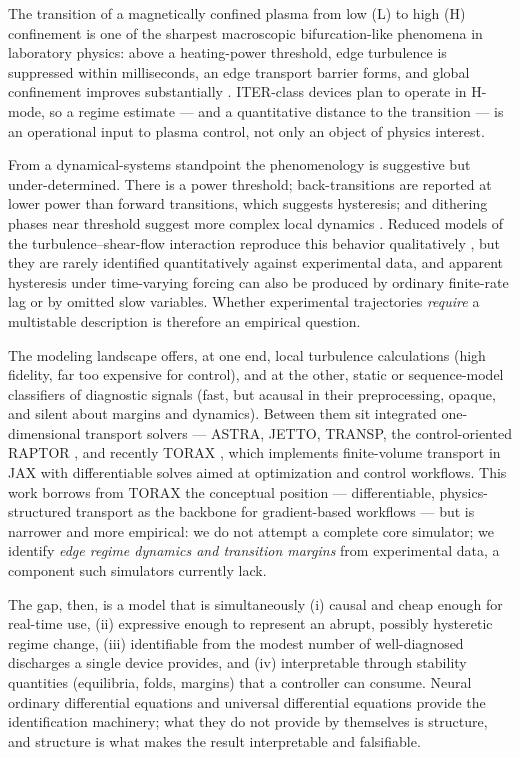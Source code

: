 \documentclass[11pt]{article}
\begin{document}
The transition of a magnetically confined plasma from low (L) to high (H)
confinement is one of the sharpest macroscopic bifurcation-like phenomena
in laboratory physics: above a heating-power threshold, edge turbulence is
suppressed within milliseconds, an edge transport barrier forms, and
global confinement improves substantially \citep{wagner1982}. ITER-class
devices plan to operate in H-mode, so a regime estimate --- and a
quantitative distance to the transition --- is an operational input to
plasma control, not only an object of physics interest.

From a dynamical-systems standpoint the phenomenology is suggestive but
under-determined. There is a power threshold; back-transitions are
reported at lower power than forward transitions, which suggests
hysteresis; and dithering phases near threshold suggest more complex local
dynamics \citep{connor2000}. Reduced models of the turbulence--shear-flow
interaction reproduce this behavior qualitatively \citep{kim2003}, but
they are rarely identified quantitatively against experimental data, and
apparent hysteresis under time-varying forcing can also be produced by
ordinary finite-rate lag or by omitted slow variables. Whether experimental
trajectories \emph{require} a multistable description is therefore an
empirical question.

The modeling landscape offers, at one end, local turbulence calculations
(high fidelity, far too expensive for control), and at the other, static
or sequence-model classifiers of diagnostic signals (fast, but acausal in
their preprocessing, opaque, and silent about margins and dynamics).
Between them sit integrated one-dimensional transport solvers ---
ASTRA, JETTO, TRANSP, the control-oriented RAPTOR \citep{felici2011}, and
recently TORAX \citep{citrin2024torax}, which implements finite-volume
transport in JAX with differentiable solves aimed at optimization and
control workflows. This work borrows from TORAX the conceptual position
--- differentiable, physics-structured transport as the backbone for
gradient-based workflows --- but is narrower and more empirical: we do not
attempt a complete core simulator; we identify \emph{edge regime dynamics
and transition margins} from experimental data, a component such
simulators currently lack.

The gap, then, is a model that is simultaneously
(i) causal and cheap enough for real-time use,
(ii) expressive enough to represent an abrupt, possibly hysteretic regime
change,
(iii) identifiable from the modest number of well-diagnosed discharges a
single device provides, and
(iv) interpretable through stability quantities (equilibria, folds,
margins) that a controller can consume.
Neural ordinary differential equations \citep{chen2018neuralode} and
universal differential equations \citep{rackauckas2020universal} provide
the identification machinery; what they do not provide by themselves is
structure, and structure is what makes the result interpretable and
falsifiable.
\end{document}
